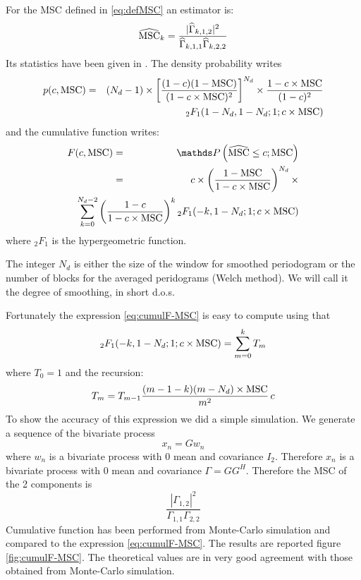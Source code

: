 For the MSC defined in \eqref{eq:defMSC} an estimator is:
\begin{eqnarray}
\label{eq:MSCestimate}
 \widehat{\mathrm{MSC}}_{k}= \frac{|\widehat\Gamma_{k,1,2}|^{2}}{\widehat\Gamma_{k,1,1}\widehat\Gamma_{k,2,2}}
\end{eqnarray}
Its statistics have been given in \cite{carter:1973}. The density probability writes
\begin{eqnarray}
\label{eq:pdf-MSC}
p(c,\mathrm{MSC})
 &=&\nonumber
 (N_{d}-1)\times \left[
 \frac{(1-c)(1-\mathrm{MSC})}{(1-c\times\mathrm{MSC})^{2}}
 \right]^{N_{d}}\times\frac{1-c\times\mathrm{MSC}}{(1-c)^{2}}
 \\
 &&{}_{2}F_{1}(1-N_{d},1-N_{d};1;c\times\mathrm{MSC})
\end{eqnarray}
and the cumulative function writes:
\begin{eqnarray}
\label{eq:cumulF-MSC}
F(c,\MSC)
 &=& \nonumber
\prob{\hMSC\leq c;\MSC}
\\
 &=&\nonumber
 c \times \left(
 \frac{1-\MSC}{1-c\times\MSC}
 \right)^{N_{d}} \times
  \\
 &&\hspace{-2cm}
 \sum_{k=0}^{N_{d}-2}\left(\frac{1-c}{1-c\times\MSC}\right)^{k}
  {}_{2}F_{1}(-k,1-N_{d};1;c\times\MSC)
\end{eqnarray}
where ${}_{2}F_{1}$ is the hypergeometric function.

The integer $N_{d}$ is either the size of the window for smoothed periodogram or the number of blocks for the averaged peridograms (Welch method). We will call it the  degree of smoothing, in short d.o.s.

Fortunately the expression \eqref{eq:cumulF-MSC} is easy to compute using that
$$
 {}_{2}F_{1}(-k,1-N_{d};1;c\times\mathrm{MSC})=\sum_{m=0}^{k}T_{m}
$$ 
where $T_{0}=1$ and the recursion:
\begin{eqnarray}
\label{eq:Trecursion}
T_{m} = T_{m-1}\frac{(m-1-k)(m-N_{d})\times\mathrm{MSC}}{m^{2}}\,c
\end{eqnarray}
To show the accuracy of this expression we did a simple simulation. We generate a sequence of the bivariate process
$$
 x_{n} = Gw_{n}
$$
where $w_{n}$ is a bivariate process with 0 mean and covariance $I_{2}$. Therefore $x_{n}$ is a bivariate process with 0 mean  and covariance $\Gamma=GG^{H}$. Therefore the MSC of the 2 components is
$$
 \frac{|\Gamma_{1,2}|^{2}}{\Gamma_{1,1}\Gamma_{2,2}}
$$
Cumulative function has been performed from Monte-Carlo simulation and compared to the expression
\eqref{eq:cumulF-MSC}. The results are reported figure \ref{fig:cumulF-MSC}. The theoretical values are in very good agreement with those obtained from Monte-Carlo simulation. 

